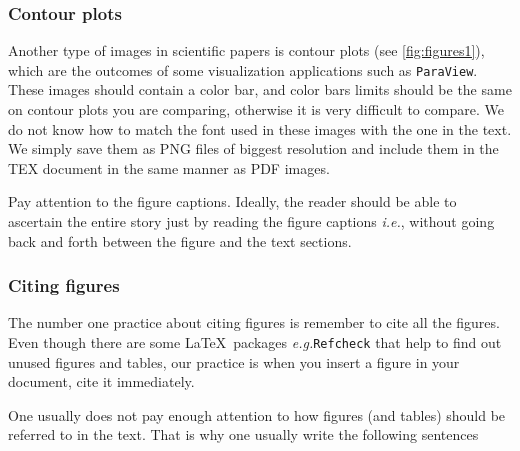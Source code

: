 \documentclass[authoryear,3p,times,preprint,review,fleqn]{elsarticle}
\newcommand{\eg}{\textit{e.g.}\xspace}
\newcommand{\ie}{\textit{i.e.},\xspace}
\numberwithin{equation}{section}
\theoremstyle{remark}
\begin{document}
\begin{figure}[!h]
\begin{snippetlatex}[caption={\texttt{TikZ} code used to obtain \cref{fig:tikz}.},label={snippet_code_tikz},framerule=1pt,tabsize=3]
  \end{snippetlatex}
\end{figure}



\subsubsection{Contour plots}\label{sec:contours}

Another type of images in scientific papers is contour plots (see \cref{fig:figures1}), which are the outcomes of some visualization applications such as \texttt{ParaView}. These images should contain a color bar, and color bars limits should be the same on contour plots you are comparing, otherwise it is very difficult to compare. We do not know how to match the font used in these images with the one in the text. We simply save them as PNG files of biggest resolution and include them in the TEX document in the same manner as PDF images.

 Pay attention to the figure captions. Ideally, the reader should be able to ascertain the entire story just by reading the figure captions \ie without going back and forth between the figure and the text sections.

 \subsubsection{Citing figures}\label{sec:citing-figs}

 The number one practice about citing figures is remember to cite all the figures. Even though there are some \LaTeX\ packages \eg \texttt{Refcheck} that help to find out unused figures and tables, our practice is when you insert a figure in your document, cite it immediately.

 One usually does not pay enough attention to how figures (and tables) should be referred to in the text. That is why one usually write the following sentences
\end{document}
